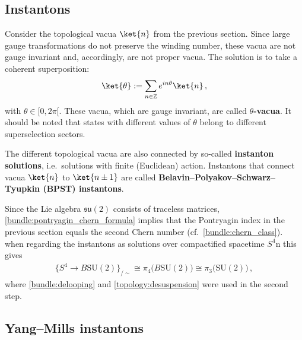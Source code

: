 
\subsection{Instantons}

    Consider the topological vacua $\ket{n}$  from the previous section. Since large gauge transformations do not preserve the winding number, these vacua are not gauge invariant and, accordingly, are not proper vacua. The solution is to take a coherent superposition:
    \begin{gather}
        \ket{\theta} := \sum_{n\in\mathbb{Z}}e^{in\theta}\ket{n}\,,
    \end{gather}
    with $\theta\in[0,2\pi[$. These vacua, which are gauge invariant, are called \textbf{$\theta$-vacua}. It should be noted that states with different values of $\theta$ belong to different superselection sectors.
    
    The different topological vacua are also connected by so-called \textbf{instanton solutions}, i.e.~solutions with finite (Euclidean) action. Instantons that connect vacua $\ket{n}$ to $\ket{n\pm1}$ are called \textbf{Belavin--Polyakov--Schwarz--Tyupkin (BPST) instantons}.

    Since the Lie algebra $\mathfrak{su}(2)$ consists of traceless matrices, \cref{bundle:pontryagin_chern_formula} implies that the Pontryagin index in the previous section equals the second Chern number (cf.~\cref{bundle:chern_class}). when regarding the instantons as solutions over compactified spacetime $S^4$n this gives
    \begin{gather}
        \{S^4\rightarrow B\mathrm{SU}(2)\}_{/\sim} \cong \pi_4\bigl(B\mathrm{SU}(2)\bigr)\cong\pi_3\bigl(\mathrm{SU}(2)\bigr)\,,
    \end{gather}
    where \cref{bundle:delooping} and \cref{topology:desuspension} were used in the second step.


\subsection{Yang--Mills instantons}

